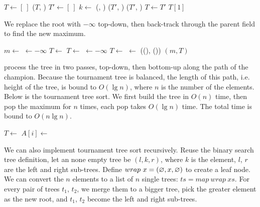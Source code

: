 \documentclass[b5paper]{article}
\begin{document}
\begin{algorithmic}[1]
  \State $T \gets [\ ]$
    \State {}($T$, )
  \EndFor
    \State $T' \gets [\ ]$
      \State $k \gets$ (, )
      \State {}($T'$, )
    \EndFor
      \State {}($T'$, )
    \EndIf
    \State $T \gets T'$
  \EndWhile
  \State \Return $T[1]$
\EndFunction
\end{algorithmic}

We replace the root with $-\infty$ top-down, then back-track through the parent field to find the new maximum.

\begin{algorithmic}[1]
  \State $m \gets$ 
  \State {} $\gets -\infty$
    
      \State $T \gets$ 
    \Else
      \State $T \gets$ 
    \EndIf
    \State {} $\gets -\infty$
  \EndWhile
   
    \State $T \gets$ 
    \State {} $\gets$ ((), ())
  \EndWhile
  \State \Return $(m, T)$ 
\EndFunction
\end{algorithmic}

 process the tree in two passes, top-down, then bottom-up along the path of the champion. Because the tournament tree is balanced, the length of this path, i.e. height of the tree, is bound to $O(\lg n)$, where $n$ is the number of the elements. Below is the tournament tree sort. We first build the tree in $O(n)$ time, then pop the maximum for $n$ times, each pop takes $O(\lg n)$ time. The total time is bound to $O(n \lg n)$.

\begin{algorithmic}
  \State $T \gets$ 
    \State $A[i] \gets$ 
  \EndFor
\EndProcedure
\end{algorithmic}

We can also implement tournament tree sort recursively. Reuse the binary search tree definition, let an none empty tree be $(l, k, r)$, where $k$ is the element, $l$, $r$ are the left and right sub-trees. Define $wrap\ x = (\varnothing, x, \varnothing)$ to create a leaf node. We can convert the $n$ elements to a list of $n$ single trees: $ts = map\ wrap\ xs$. For every pair of trees $t_1$, $t_2$, we merge them to a bigger tree, pick the greater element as the new root, and $t_1$, $t_2$ become the left and right sub-trees.
\end{document}

